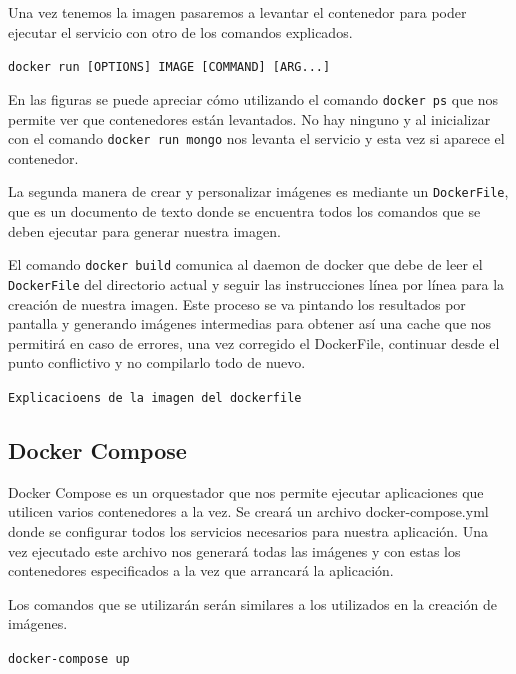 Una vez tenemos la imagen pasaremos a levantar el contenedor para poder ejecutar el servicio con otro de los comandos explicados. 

\begin{center}
\texttt{docker run [OPTIONS] IMAGE [COMMAND] [ARG...]}
\end{center}

En las figuras se puede apreciar cómo utilizando el comando \texttt{docker ps} que nos permite ver que contenedores están levantados. No hay ninguno y al inicializar con el comando \texttt{docker run mongo} nos levanta el servicio y esta vez si aparece el contenedor.
\newline

La segunda manera de crear y personalizar imágenes es mediante un \texttt{DockerFile}, que es un documento de texto donde se encuentra todos los comandos que se deben ejecutar para generar nuestra imagen.

El comando \texttt{docker build} comunica al daemon de docker que debe de leer el \texttt{DockerFile} del directorio actual y seguir las instrucciones línea por línea para la creación de nuestra imagen. Este proceso se va pintando los resultados por pantalla y generando imágenes intermedias para obtener así una cache que nos permitirá en caso de errores, una vez corregido el DockerFile, continuar desde el punto conflictivo y no compilarlo todo de nuevo. 

\begin{center}
\texttt{Explicacioens de la imagen del dockerfile}
\end{center}

\subsection{Docker Compose}

Docker Compose es un orquestador que nos permite ejecutar aplicaciones que utilicen varios contenedores a la vez.
Se creará un archivo docker-compose.yml donde se configurar todos los servicios necesarios para nuestra aplicación. Una vez ejecutado este archivo nos generará todas las imágenes y con estas los contenedores especificados a la vez que arrancará la aplicación.
\pagebreak

Los comandos que se utilizarán serán similares a los utilizados en la creación de imágenes.

\begin{center}
\texttt{docker-compose up}
\end{center} 

